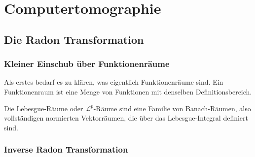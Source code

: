 \chapter{Computertomographie}
\label{cha:Computertomographie}



\section{Die Radon Transformation}





\subsection{Kleiner Einschub über Funktionenräume}

Als erstes bedarf es zu klären, was eigentlich Funktionenräume sind. Ein Funktionenraum ist eine Menge von Funktionen mit denselben Definitionsbereich.  

	Die Lebesgue-Räume oder $\mathcal{L}^p$-Räume sind eine Familie von Banach-Räumen, also vollständigen normierten Vektorräumen, die über das Lebesgue-Integral  definiert sind.

\subsection{Inverse Radon Transformation}



\newpage
